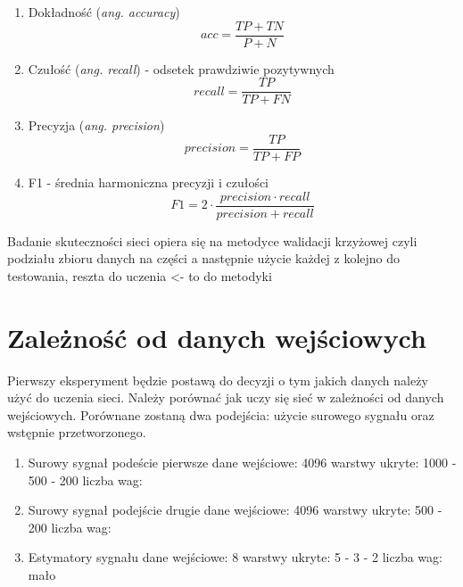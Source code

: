 \documentclass[inzynierska]{pwr_wmat_praca_dyplomowa}
\theoremstyle{plain}
\numberwithin{theorem}{chapter}
\theoremstyle{definition}
\numberwithin{theorem}{chapter}
\begin{document}
\begin{center}
	\begin{enumerate}
		\item Dokładność (\textit{ang. accuracy})
		\begin{equation}
		acc = \frac{TP + TN}{P + N}
		\end{equation}
		\item Czułość (\textit{ang. recall}) - odsetek prawdziwie pozytywnych
		\begin{equation}
		recall = \frac{TP}{TP + FN}
		\end{equation}
		\item Precyzja (\textit{ang. precision})
		\begin{equation}
		precision = \frac{TP}{TP + FP}
		\end{equation}
		\item F1 - średnia harmoniczna precyzji i czułości 
		\begin{equation}
		F1 = 2 \cdot \frac{precision \cdot recall}{precision + recall}
		\end{equation}
	\end{enumerate}
	
\end{center}

Badanie skuteczności sieci opiera się na metodyce walidacji krzyżowej czyli podziału zbioru danych na części a następnie użycie każdej z kolejno do testowania, reszta do uczenia <- to do metodyki


\section{Zależność od danych wejściowych}
Pierwszy eksperyment będzie postawą do decyzji o tym jakich danych należy użyć do uczenia sieci. Należy porównać jak uczy się sieć w zależności od danych wejściowych. Porównane zostaną dwa podejścia: użycie surowego sygnału oraz wstępnie przetworzonego. 

\begin{enumerate}
	\item Surowy sygnał podeście pierwsze
	\subitem dane wejściowe: 4096
	\subitem warstwy ukryte: 1000 - 500 - 200
	\subitem liczba wag: 
	
	\item Surowy sygnał podejście drugie
	\subitem dane wejściowe: 4096
	\subitem warstwy ukryte: 500 - 200
	\subitem liczba wag:
	
	\item Estymatory sygnału
	\subitem dane wejściowe: 8
	\subitem warstwy ukryte: 5 - 3 - 2
	\subitem liczba wag: mało
\end{enumerate}
\end{document}
